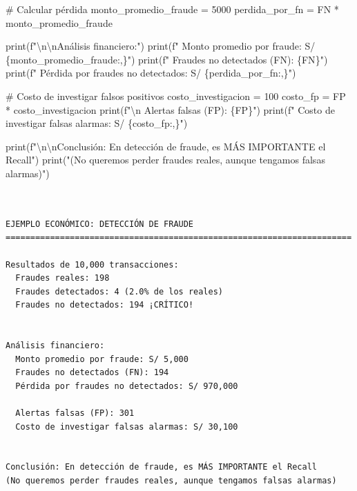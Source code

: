 \documentclass[
  doc,
  floatsintext,
  longtable,
  a4paper,
  nolmodern,
  notxfonts,
  notimes,
  12pt,
  colorlinks=true,linkcolor=blue,citecolor=blue,urlcolor=blue]{apa7}
\newenvironment{Shaded}{\begin{snugshade}}{\end{snugshade}}
\newcommand{\BuiltInTok}[1]{\textcolor[rgb]{0.00,0.23,0.31}{#1}}
\newcommand{\CharTok}[1]{\textcolor[rgb]{0.13,0.47,0.30}{#1}}
\newcommand{\CommentTok}[1]{\textcolor[rgb]{0.37,0.37,0.37}{#1}}
\newcommand{\DecValTok}[1]{\textcolor[rgb]{0.68,0.00,0.00}{#1}}
\newcommand{\NormalTok}[1]{\textcolor[rgb]{0.00,0.23,0.31}{#1}}
\newcommand{\OperatorTok}[1]{\textcolor[rgb]{0.37,0.37,0.37}{#1}}
\newcommand{\SpecialCharTok}[1]{\textcolor[rgb]{0.37,0.37,0.37}{#1}}
\newcommand{\SpecialStringTok}[1]{\textcolor[rgb]{0.13,0.47,0.30}{#1}}
\newcommand{\StringTok}[1]{\textcolor[rgb]{0.13,0.47,0.30}{#1}}
\begin{document}
\begin{Shaded}
\begin{Highlighting}[]
\CommentTok{\# Calcular pérdida}
\NormalTok{monto\_promedio\_fraude }\OperatorTok{=} \DecValTok{5000}
\NormalTok{perdida\_por\_fn }\OperatorTok{=}\NormalTok{ FN }\OperatorTok{*}\NormalTok{ monto\_promedio\_fraude}

\BuiltInTok{print}\NormalTok{(}\SpecialStringTok{f"}\CharTok{\textbackslash{}n\textbackslash{}n}\SpecialStringTok{Análisis financiero:"}\NormalTok{)}
\BuiltInTok{print}\NormalTok{(}\SpecialStringTok{f"  Monto promedio por fraude: S/ }\SpecialCharTok{\{}\NormalTok{monto\_promedio\_fraude}\SpecialCharTok{:,\}}\SpecialStringTok{"}\NormalTok{)}
\BuiltInTok{print}\NormalTok{(}\SpecialStringTok{f"  Fraudes no detectados (FN): }\SpecialCharTok{\{}\NormalTok{FN}\SpecialCharTok{\}}\SpecialStringTok{"}\NormalTok{)}
\BuiltInTok{print}\NormalTok{(}\SpecialStringTok{f"  Pérdida por fraudes no detectados: S/ }\SpecialCharTok{\{}\NormalTok{perdida\_por\_fn}\SpecialCharTok{:,\}}\SpecialStringTok{"}\NormalTok{)}

\CommentTok{\# Costo de investigar falsos positivos}
\NormalTok{costo\_investigacion }\OperatorTok{=} \DecValTok{100}
\NormalTok{costo\_fp }\OperatorTok{=}\NormalTok{ FP }\OperatorTok{*}\NormalTok{ costo\_investigacion}
\BuiltInTok{print}\NormalTok{(}\SpecialStringTok{f"}\CharTok{\textbackslash{}n}\SpecialStringTok{  Alertas falsas (FP): }\SpecialCharTok{\{}\NormalTok{FP}\SpecialCharTok{\}}\SpecialStringTok{"}\NormalTok{)}
\BuiltInTok{print}\NormalTok{(}\SpecialStringTok{f"  Costo de investigar falsas alarmas: S/ }\SpecialCharTok{\{}\NormalTok{costo\_fp}\SpecialCharTok{:,\}}\SpecialStringTok{"}\NormalTok{)}

\BuiltInTok{print}\NormalTok{(}\SpecialStringTok{f"}\CharTok{\textbackslash{}n\textbackslash{}n}\SpecialStringTok{Conclusión: En detección de fraude, es MÁS IMPORTANTE el Recall"}\NormalTok{)}
\BuiltInTok{print}\NormalTok{(}\StringTok{"(No queremos perder fraudes reales, aunque tengamos falsas alarmas)"}\NormalTok{)}
\end{Highlighting}
\end{Shaded}

\begin{verbatim}


EJEMPLO ECONÓMICO: DETECCIÓN DE FRAUDE
======================================================================

Resultados de 10,000 transacciones:
  Fraudes reales: 198
  Fraudes detectados: 4 (2.0% de los reales)
  Fraudes no detectados: 194 ¡CRÍTICO!


Análisis financiero:
  Monto promedio por fraude: S/ 5,000
  Fraudes no detectados (FN): 194
  Pérdida por fraudes no detectados: S/ 970,000

  Alertas falsas (FP): 301
  Costo de investigar falsas alarmas: S/ 30,100


Conclusión: En detección de fraude, es MÁS IMPORTANTE el Recall
(No queremos perder fraudes reales, aunque tengamos falsas alarmas)
\end{verbatim}
\end{document}
